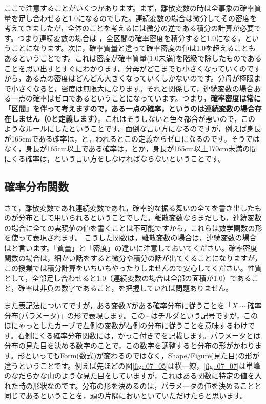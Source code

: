 \documentclass{ltjbook}
\begin{document}
ここで注意することがいくつかあります。まず，離散変数の時は全事象の確率質量を足し合わせると1.0になるのでした。連続変数の場合は微分してその密度を考えてきましたが，全体のことを考えるには微分の逆である積分の計算が必要です。つまり連続変数の場合は
，全区間の確率密度を積分すると1.0になる，ということになります。次に，確率質量と違って確率密度の値は1.0を超えることもあるということです。これは密度が確率質量(1.0未満)を階級で除したものであることを思い出すとすぐにわかります。分母がどこまでも小さくなっていくのですから，ある点の密度はどんどん大きくなっていくしかないのです。分母が極限まで小さくなると，密度は無限大になります。それと関係して，連続変数の場合ある一点の確率はゼロであるということになっています。つまり，\textbf{確率密度は常に「区間」を伴って考えますので，ある一点の確率，というのは連続変数の場合存在しません（0と定義します）}。これはそうしないと色々都合が悪いので，このようなルールにしたということです。面倒な言い方になるのですが，例えば身長が165cmである確率は，と言われるとこの定義からゼロになるのです。そうではなく，身長が165cm以上である確率は，とか，身長が165cm以上170cm未満の間にくる確率は，という言い方をしなければならないということです。

\subsection{確率分布関数}
さて，離散変数であれ連続変数であれ，確率的な振る舞いの全てを書き出したものが分布として用いられるということでした。離散変数ならまだしも，連続変数の場合に全ての実現値の値を書くことは不可能ですから，これらは数学関数の形を使って表現されます。
こうした関数は，離散変数の場合は，連続変数の場合はと言います。「質量」と「密度」の違いに注意しておいてください。確率密度関数の場合は，細かい話をすると微分や積分の話が出てくることになりますが，この授業では積分計算をいちいちやったりしませんので安心してください。性質として，全部足し合わせると1.0（連続変数の場合は全部の面積が1.0）であること，確率は非負の数字であること，を把握していれば問題ありません。

また表記法についてですが，ある変数$X$がある確率分布に従うことを「$X\sim$確率分布(パラメータ)」の形で表現します。この$\sim$はチルダという記号ですが，このほにゃっとしたカーブで左側の変数が右側の分布に従うことを意味するわけです。右側にくる確率分布関数には，かっこ付きでを記載します。パラメータとは分布の見た目を決める数字のことで，この数字を調整すると分布の形がかわります。形といってもForm(数式)が変わるのではなく，Shape/Figure(見た目)の形が違うということです。例えば先ほどの図\ref{fig::07_05}は横一線，\ref{fig::07_07}は単峰のなだらかな山のような見た目をしていますが，これはある関数に特定の値を入れた時の形状なのです。分布の形を決めるのは，パラメータの値を決めることと同じであるということを，頭の片隅においといていただけたらと思います。
\end{document}
